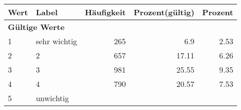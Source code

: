      \begin{longtable}{lXrrr}
     \toprule
     \textbf{Wert} & \textbf{Label} & \textbf{Häufigkeit} & \textbf{Prozent(gültig)} & \textbf{Prozent} \\
     \endhead
     \midrule
     \multicolumn{5}{l}{\textbf{Gültige Werte}}\\

     1 &
     \multicolumn{1}{X}{ sehr wichtig   } &


       \num{265} &
       \num[round-mode=places,round-precision=2]{6,9} &
         \num[round-mode=places,round-precision=2]{2,53} \\

     2 &
     \multicolumn{1}{X}{ 2   } &


       \num{657} &
       \num[round-mode=places,round-precision=2]{17,11} &
         \num[round-mode=places,round-precision=2]{6,26} \\

     3 &
     \multicolumn{1}{X}{ 3   } &


       \num{981} &
       \num[round-mode=places,round-precision=2]{25,55} &
         \num[round-mode=places,round-precision=2]{9,35} \\

     4 &
     \multicolumn{1}{X}{ 4   } &


       \num{790} &
       \num[round-mode=places,round-precision=2]{20,57} &
         \num[round-mode=places,round-precision=2]{7,53} \\

     5 &
     \multicolumn{1}{X}{ unwichtig   } &



\end{longtable}
